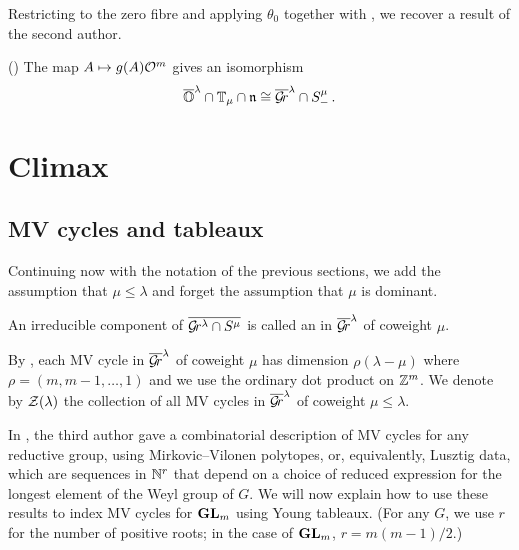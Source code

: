 \documentclass{article}
\begin{document}
Restricting to the zero fibre and applying $\theta_0$ together with , we recover a result of the second author. 
\begin{corollary}
    \label{cor:mvy} (\cite[Corollary~5.2.2]{dthesis})
The map $ A \mapsto g(A)\mathcal O^m$ gives an isomorphism 
$$\overline{\mathbb O}^\lambda \cap \mathbb T_\mu\cap\mathfrak n \cong\overline{\mathcal{G}\!r}^\lambda\cap S^\mu_-\,.$$
\end{corollary}
% 

\section{Climax}
\label{s:climax}
% 
\subsection{MV cycles and tableaux}
\label{ss:mvcs}
% 

Continuing now with the notation of the previous sections, we add the assumption that $\mu\le\lambda$ and forget the assumption that $\mu$ is dominant. 
% 
\begin{definition}
    An irreducible component of $\overline{\mathcal{G}\!r^\lambda \cap S^\mu}$ is called an  in $\overline{\mathcal{G}\!r}^\lambda$ of coweight $\mu$. 
\end{definition}

By \cite[Theorem~3.2(b)]{mirkovic2007geometric}, each MV cycle in $\overline{\mathcal{G}\!r}^\lambda$ of coweight $\mu$ has dimension $ \rho(\lambda - \mu)$ where $ \rho = (m, m-1, \dots, 1)$ and we use the ordinary dot product on $\mathbb Z^m$. We denote by $\mathcal Z(\lambda)$ the collection of all MV cycles in $\overline{\mathcal{G}\!r}^\lambda$ of coweight $\mu\le\lambda$. 

In \cite{kamnitzer2010mirkovic}, the third author gave a combinatorial description of MV cycles for any reductive group, using Mirkovic--Vilonen polytopes, or, equivalently, Lusztig data, which are sequences in $\mathbb N^{r}$ that depend on a choice of reduced expression for the longest element of the Weyl group of $G$.  We will now explain how to use these results to index MV cycles for $ {\mathbf{GL}}_m$ using Young tableaux. (For any $ G$, we use $ r $ for the number of positive roots; in the case of $ {\mathbf{GL}}_m$, $ r = m(m-1)/2$.)
\end{document}
